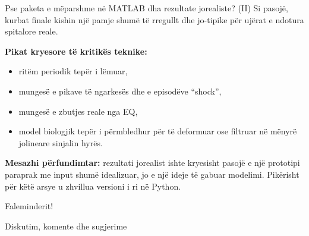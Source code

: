 \documentclass[aspectratio=169]{beamer}
\begin{document}
\begin{frame}{Pse paketa e mëparshme në MATLAB dha rezultate jorealiste? (II)}
\justifying
Si pasojë, kurbat finale kishin një pamje shumë të rregullt dhe jo-tipike për ujërat e ndotura spitalore reale.
\vspace{0.4em}

\textbf{Pikat kryesore të kritikës teknike:}
\begin{itemize}
    \item ritëm periodik tepër i lëmuar,
    \item mungesë e pikave të ngarkesës dhe e episodëve ``shock'',
    \item mungesë e zbutjes reale nga EQ,
    \item model biologjik tepër i përmbledhur për të deformuar ose filtruar në mënyrë jolineare sinjalin hyrës.
\end{itemize}
\vspace{0.4em}

\textbf{Mesazhi përfundimtar:} rezultati jorealist ishte kryesisht pasojë e një \alert{prototipi paraprak me input shumë idealizuar}, jo e një ideje të gabuar modelimi. Pikërisht për këtë arsye u zhvillua versioni i ri në Python.
\end{frame}

\begin{frame}
\centering
\Huge Faleminderit!

\vspace{1em}
\Large Diskutim, komente dhe sugjerime
\end{frame}
\end{document}
